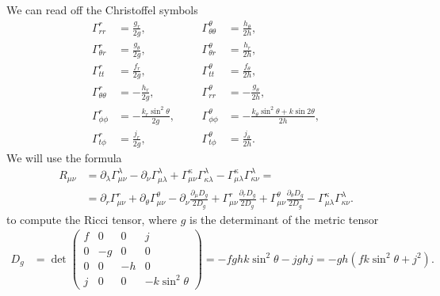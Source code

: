 \documentclass[english, parskip=full]{scrartcl}
\newcommand{\kla}{}
\begin{document}
We can read off the Christoffel symbols
\begin{align}
\Gamma^r_{rr} &= \frac{g_r}{2g}, &&&\Gamma^\theta_{\theta\theta} &= \frac{h_\theta}{2h},\\
\Gamma^r_{\theta r} &= \frac{g_\theta}{2g}, &&&\Gamma^\theta_{\theta r} &= \frac{h_r}{2h},\\
\Gamma^r_{tt} &= \frac{f_r}{2g}, &&&\Gamma^\theta_{tt} &= \frac{f_\theta}{2h},\\
\Gamma^r_{\theta\theta} &= -\frac{h_r}{2g}, &&&\Gamma^\theta_{rr} &= -\frac{g_\theta}{2h},\\
\Gamma^r_{\phi\phi} &= -\frac{k_r\sin^2\theta}{2g}, &&&\Gamma^\theta_{\phi\phi} &= -\frac{k_\theta\sin^2\theta + k\sin2\theta }{2h},\\
\Gamma^r_{t\phi} &= \frac{j_r}{2g}, &&&\Gamma^\theta_{t\phi} &= \frac{j_\theta}{2h}.
\end{align}
We will use the formula
\begin{align}
R_{\mu\nu} &= \partial_\lambda \Gamma^\lambda_{\mu\nu} - \partial_\nu \Gamma^\lambda_{\mu\lambda} + \Gamma^\kappa_{\mu\nu} \Gamma^\lambda_{\kappa\lambda} - \Gamma^\kappa_{\mu\lambda} \Gamma^\lambda_{\kappa\nu} = \\
&= \partial_r\Gamma^r_{\mu\nu} + \partial_\theta\Gamma^\theta_{\mu\nu} - \partial_\nu \frac{\partial_\mu D_g}{2D_g} + \Gamma^r_{\mu\nu} \frac{\partial_r D_g}{2D_g} + \Gamma^\theta_{\mu\nu} \frac{\partial_\theta D_g}{2D_g} - \Gamma^\kappa_{\mu\lambda} \Gamma^\lambda_{\kappa\nu}.
\end{align}
to compute the Ricci tensor, where $g$ is the determinant of the metric tensor
\begin{align}
D_g &= \det \begin{pmatrix}
f & 0 & 0 & j \\ 
0 & -g & 0 & 0 \\
0 & 0 & -h & 0 \\
j & 0 & 0 & -k\sin^2\theta
\end{pmatrix} = -fghk\sin^2\theta - jghj = -gh \kla\left( fk\sin^2\theta + j^2 \right).
\end{align}
\end{document}
